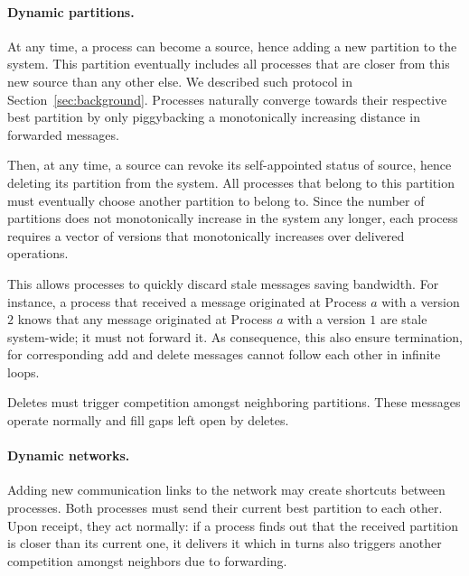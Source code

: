 \paragraph{Dynamic partitions.}
At any time, a process can become a source, hence adding a new
partition to the system. This partition eventually includes all
processes that are closer from this new source than any other else. We
described such protocol in Section~\ref{sec:background}. Processes
naturally converge towards their respective best partition by only
piggybacking a monotonically increasing distance in forwarded
messages. %

Then, at any time, a source can revoke its self-appointed status of
source, hence deleting its partition from the system. All processes
that belong to this partition must eventually choose another partition
to belong to. Since the number of partitions does not monotonically
increase in the system any longer, each process requires a vector of
versions that monotonically increases over delivered operations.

This allows processes to quickly discard stale messages saving
bandwidth. For instance, a process that received a message originated
at Process $a$ with a version $2$ knows that any message originated at
Process $a$ with a version $1$ are stale system-wide; it must not
forward it. As consequence, this also ensure termination, for
corresponding add and delete messages cannot follow each other in
infinite loops.

\noindent Deletes must trigger competition amongst neighboring
partitions. These  messages operate normally and fill gaps
left open by deletes. 




\paragraph{Dynamic networks.}
Adding new communication links to the network may create shortcuts
between processes. Both processes must send their current best
partition to each other. Upon receipt, they act normally: if a process
finds out that the received partition is closer than its current one,
it delivers it which in turns also triggers another competition
amongst neighbors due to forwarding.

